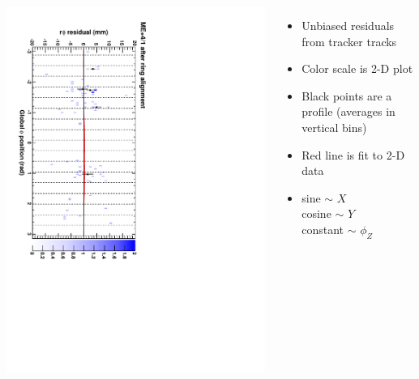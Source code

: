 \documentclass[compress]{beamer}
\begin{document}
\begin{frame}
\begin{columns}
\includegraphics[height=\linewidth, angle=90]{ringfits_after/mep41.pdf}
\begin{itemize}
\item Unbiased residuals from tracker tracks
\item Color scale is 2-D plot
\item Black points are a profile (averages in vertical bins)
\item Red line is fit to 2-D data
\item sine $\sim$ $X$ \\
cosine $\sim$ $Y$ \\
constant $\sim$ $\phi_Z$
\end{itemize}
\end{columns}
\end{frame}
\end{document}
